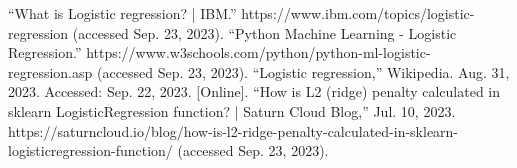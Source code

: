 \documentclass[journal]{IEEEtran}
\begin{document}
\begin{thebibliography}{00}
“What is Logistic regression? | IBM.” https://www.ibm.com/topics/logistic-regression (accessed Sep. 23, 2023).
“Python Machine Learning - Logistic Regression.” https://www.w3schools.com/python/python-ml-logistic-regression.asp (accessed Sep. 23, 2023).
“Logistic regression,” Wikipedia. Aug. 31, 2023. Accessed: Sep. 22, 2023. [Online].
“How is L2 (ridge) penalty calculated in sklearn LogisticRegression function? | Saturn Cloud Blog,” Jul. 10, 2023. https://saturncloud.io/blog/how-is-l2-ridge-penalty-calculated-in-sklearn-logisticregression-function/ (accessed Sep. 23, 2023).

\end{thebibliography}
\end{document}
